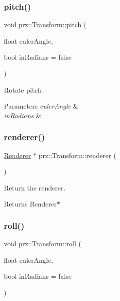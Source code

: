 \subsubsection{\texorpdfstring{pitch()}{pitch()}}
{\footnotesize\ttfamily void prz\+::\+Transform\+::pitch (\begin{DoxyParamCaption}\item[{float}]{euler\+Angle,  }\item[{bool}]{in\+Radians = {\ttfamily false} }\end{DoxyParamCaption})}



Rotate pitch. 


\begin{DoxyParams}{Parameters}
{\em euler\+Angle} & \\
\hline
{\em in\+Radians} & \\
\hline
\end{DoxyParams}
\mbox{\label{classprz_1_1_transform_ad54f15b6454bb7b1df3fa529e41032db}} 
\subsubsection{\texorpdfstring{renderer()}{renderer()}}
{\footnotesize\ttfamily \mbox{\hyperlink{classprz_1_1_renderer}{Renderer}} $\ast$ prz\+::\+Transform\+::renderer (\begin{DoxyParamCaption}{ }\end{DoxyParamCaption})}



Return the renderer. 

\begin{DoxyReturn}{Returns}
Renderer$\ast$ 
\end{DoxyReturn}
\mbox{\label{classprz_1_1_transform_a78540142dce967ed0233e49bc8da8d25}} 
\subsubsection{\texorpdfstring{roll()}{roll()}}
{\footnotesize\ttfamily void prz\+::\+Transform\+::roll (\begin{DoxyParamCaption}\item[{float}]{euler\+Angle,  }\item[{bool}]{in\+Radians = {\ttfamily false} }\end{DoxyParamCaption})}



